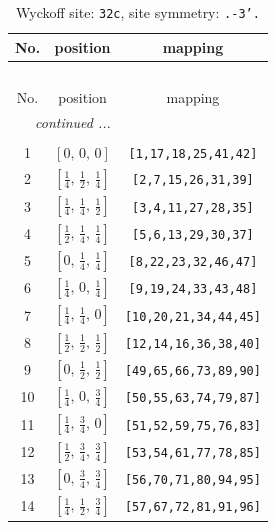 \documentclass[fleqn,8pt]{jsarticle}
\begin{document}
\begin{longtable}{ccc}
\caption{Wyckoff site: {\tt 32c}, site symmetry: {\tt .-3'.}}
 \\
 \hline \hline
No. & position & mapping \\ \hline \endfirsthead

\multicolumn{2}{l}{\tablename\ \thetable{}} \\
 \hline \hline
No. & position & mapping \\ \hline \endhead

 \hline \hline
\multicolumn{2}{r}{\footnotesize\it continued ...} \\ \endfoot

 \hline \hline
\multicolumn{2}{r}{} \\ \endlastfoot

1 & $\left[ 0,\, 0,\, 0 \right]$ & {\tt [1,17,18,25,41,42]} \\ \hline
2 & $\left[ \frac{1}{4},\, \frac{1}{2},\, \frac{1}{4} \right]$ & {\tt [2,7,15,26,31,39]} \\ \hline
3 & $\left[ \frac{1}{4},\, \frac{1}{4},\, \frac{1}{2} \right]$ & {\tt [3,4,11,27,28,35]} \\ \hline
4 & $\left[ \frac{1}{2},\, \frac{1}{4},\, \frac{1}{4} \right]$ & {\tt [5,6,13,29,30,37]} \\ \hline
5 & $\left[ 0,\, \frac{1}{4},\, \frac{1}{4} \right]$ & {\tt [8,22,23,32,46,47]} \\ \hline
6 & $\left[ \frac{1}{4},\, 0,\, \frac{1}{4} \right]$ & {\tt [9,19,24,33,43,48]} \\ \hline
7 & $\left[ \frac{1}{4},\, \frac{1}{4},\, 0 \right]$ & {\tt [10,20,21,34,44,45]} \\ \hline
8 & $\left[ \frac{1}{2},\, \frac{1}{2},\, \frac{1}{2} \right]$ & {\tt [12,14,16,36,38,40]} \\ \hline
9 & $\left[ 0,\, \frac{1}{2},\, \frac{1}{2} \right]$ & {\tt [49,65,66,73,89,90]} \\ \hline
10 & $\left[ \frac{1}{4},\, 0,\, \frac{3}{4} \right]$ & {\tt [50,55,63,74,79,87]} \\ \hline
11 & $\left[ \frac{1}{4},\, \frac{3}{4},\, 0 \right]$ & {\tt [51,52,59,75,76,83]} \\ \hline
12 & $\left[ \frac{1}{2},\, \frac{3}{4},\, \frac{3}{4} \right]$ & {\tt [53,54,61,77,78,85]} \\ \hline
13 & $\left[ 0,\, \frac{3}{4},\, \frac{3}{4} \right]$ & {\tt [56,70,71,80,94,95]} \\ \hline
14 & $\left[ \frac{1}{4},\, \frac{1}{2},\, \frac{3}{4} \right]$ & {\tt [57,67,72,81,91,96]} \\ \hline

\end{longtable}
\end{document}
